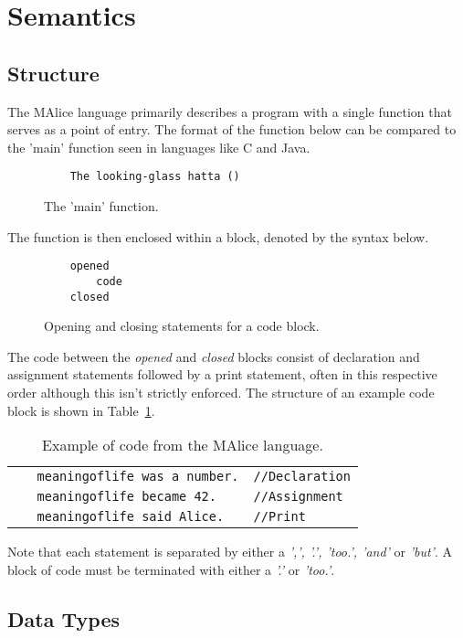 \documentclass[a4wide, 10pt]{article}
\begin{document}
\section{Semantics}
\subsection{Structure}
The MAlice language primarily describes a program with a single function 
that serves as a point of entry. The format of the function below can be
compared to the 'main' function seen in languages like C and Java.

\begin{figure}[h!]
\begin{verbatim}
    The looking-glass hatta ()
\end{verbatim}
\caption{The 'main' function.}
\end{figure}

The function is then enclosed within a block, denoted by the syntax below.
\begin{figure}[h!]
\begin{verbatim}
    opened
        code
    closed
\end{verbatim}
\caption{Opening and closing statements for a code block.}
\end{figure}

The code between the \emph{opened} and \emph{closed} blocks consist of 
declaration and assignment statements followed by a print statement, 
often in this respective order although this isn't strictly enforced. The 
structure of an example code block is shown in Table~\ref{tab:code}.

\begin{table}[h]
\begin{tabular}{l l}
\verb|   meaningoflife was a number.| & \verb|//Declaration| \\
\verb|   meaningoflife became 42.| & \verb|//Assignment| \\
\verb|   meaningoflife said Alice.| & \verb|//Print| \\
\end{tabular}
\caption{Example of code from the MAlice language.}
\label{tab:code}
\end{table}
  
Note that each statement is separated by either a \emph{',', '.', 'too.',
 'and'} or \emph{'but'}. A block of code must be terminated with either a 
 \emph{'.'} or \emph{'too.'}.

\subsection{Data Types}
\end{document}
